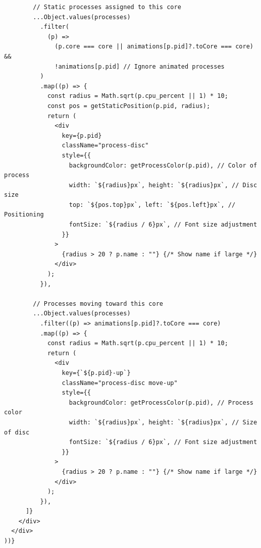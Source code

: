 \documentclass[12pt]{article}
\begin{document}
\begin{enumerate}
\begin{verbatim}
        // Static processes assigned to this core
        ...Object.values(processes)
          .filter(
            (p) =>
              (p.core === core || animations[p.pid]?.toCore === core) &&
              !animations[p.pid] // Ignore animated processes
          )
          .map((p) => {
            const radius = Math.sqrt(p.cpu_percent || 1) * 10;
            const pos = getStaticPosition(p.pid, radius);
            return (
              <div
                key={p.pid}
                className="process-disc"
                style={{
                  backgroundColor: getProcessColor(p.pid), // Color of process
                  width: `${radius}px`, height: `${radius}px`, // Disc size
                  top: `${pos.top}px`, left: `${pos.left}px`, // Positioning
                  fontSize: `${radius / 6}px`, // Font size adjustment
                }}
              >
                {radius > 20 ? p.name : ""} {/* Show name if large */}
              </div>
            );
          }),

        // Processes moving toward this core
        ...Object.values(processes)
          .filter((p) => animations[p.pid]?.toCore === core)
          .map((p) => {
            const radius = Math.sqrt(p.cpu_percent || 1) * 10;
            return (
              <div
                key={`${p.pid}-up`}
                className="process-disc move-up"
                style={{
                  backgroundColor: getProcessColor(p.pid), // Process color
                  width: `${radius}px`, height: `${radius}px`, // Size of disc
                  fontSize: `${radius / 6}px`, // Font size adjustment
                }}
              >
                {radius > 20 ? p.name : ""} {/* Show name if large */}
              </div>
            );
          }),
      ]}
    </div>
  </div>
))}

\end{verbatim}
\end{enumerate}
\end{document}
